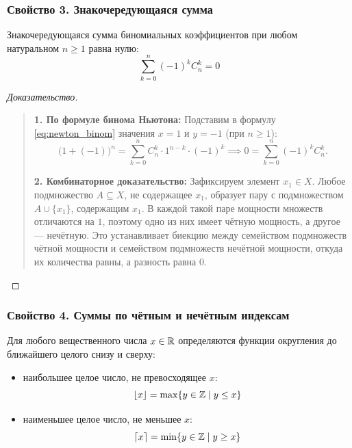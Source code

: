 \subsubsection{Свойство 3. Знакочередующаяся сумма}

\begin{proposition}
    Знакочередующаяся сумма биномиальных коэффициентов при любом натуральном 
    $n \ge 1$ равна нулю:
    \begin{equation} \label{eq:binom_sum_alt}
        \sum_{k=0}^{n} (-1)^k C_n^k = 0 \tag{4}
    \end{equation}
\end{proposition}

\begin{proof}[Доказательство]~\\
    \begin{quote}
        \textbf{1. По формуле бинома Ньютона:} 
        Подставим в формулу \eqref{eq:newton_binom} значения $x = 1$ и 
        $y = -1$ (при $n \ge 1$):
        \[
            \bigl(1 + (-1)\bigr)^n = \sum_{k=0}^{n} C_n^k \cdot 1^{n-k} \cdot (-1)^k 
            \implies 0 = \sum_{k=0}^{n} (-1)^k C_n^k.
        \]

        \textbf{2. Комбинаторное доказательство:} 
        Зафиксируем элемент $x_1 \in X$. Любое подмножество $A \subseteq X$, 
        не содержащее $x_1$, образует пару с подмножеством 
        $A \cup \{x_1\}$, содержащим $x_1$. В каждой такой паре мощности 
        множеств отличаются на $1$, поэтому одно из них имеет чётную 
        мощность, а другое --- нечётную. Это устанавливает биекцию между 
        семейством подмножеств чётной мощности и семейством подмножеств 
        нечётной мощности, откуда их количества равны, а разность равна $0$.
    \end{quote}
\end{proof}

\subsubsection{Свойство 4. Суммы по чётным и нечётным индексам}

\begin{definition}
    Для любого вещественного числа $x \in \mathbb{R}$ определяются функции 
    округления до ближайшего целого снизу и сверху:
    \begin{itemize}
        \item {} 
        наибольшее целое число, не превосходящее $x$:
        \[
            \lfloor x \rfloor = \max \{y \in \mathbb{Z} \mid y \le x\}
        \]
        \item {} 
        наименьшее целое число, не меньшее $x$:
        \[
            \lceil x \rceil = \min \{y \in \mathbb{Z} \mid y \ge x\}
        \]
    \end{itemize}
\end{definition}

